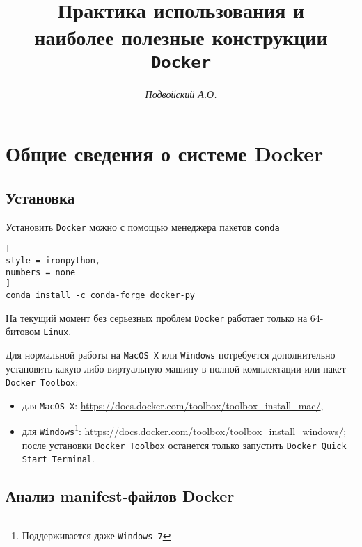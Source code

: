 \documentclass[%
	11pt,
	a4paper,
	utf8,
		]{article}
\begin{document}
\title{Практика использования и \\наиболее полезные конструкции \texttt{Docker}}

\author{\itshape Подвойский А.О.}

\date{}
\maketitle

\thispagestyle{fancy}

\tableofcontents

\section{Общие сведения о системе Docker}

\subsection{Установка}

Установить \texttt{Docker} можно с помощью менеджера пакетов \texttt{conda}

\begin{lstlisting}[
style = ironpython,
numbers = none
]
conda install -c conda-forge docker-py
\end{lstlisting}

На текущий момент без серьезных проблем \texttt{Docker} работает только на 64-битовом \texttt{Linux}.

Для нормальной работы на \texttt{MacOS X} или \texttt{Windows} потребуется дополнительно установить какую-либо виртуальную машину в полной комплектации или пакет \texttt{Docker Toolbox}:

\begin{itemize}
	\item для \texttt{MacOS X}: \url{https://docs.docker.com/toolbox/toolbox_install_mac/},
	
	\item для \texttt{Windows}\footnote{Поддерживается даже \texttt{Windows 7}}: \url{https://docs.docker.com/toolbox/toolbox_install_windows/}; после установки \texttt{Docker Toolbox} останется только запустить \texttt{Docker Quick Start Terminal}.
\end{itemize}

\subsection{Анализ manifest-файлов Docker}
\end{document}
